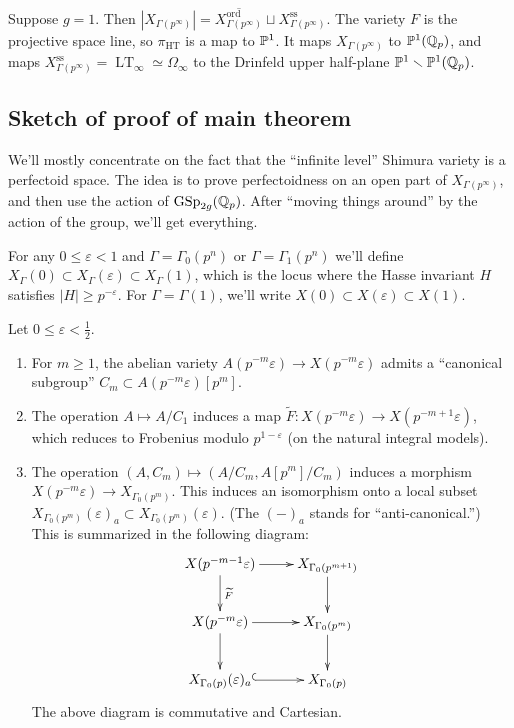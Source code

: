 \begin{example}
Suppose $g=1$. Then $|X_{\Gamma(p^\infty)}| = \overline{X_{\Gamma(p^\infty)}^\text{ord}}\sqcup X_{\Gamma(p^\infty)}^\text{ss}$. The variety $F$ is the projective space line, so 
$\pi_\text{HT}$ is a map to $\mathbb{P}^1$. It maps $X_{\Gamma(p^\infty)}$ to 
$\mathbb{P}^1(\mathbb{Q}_p)$, and maps 
$X_{\Gamma(p^\infty)}^\text{ss} = \operatorname{LT}_\infty\simeq \Omega_\infty$ 
to the Drinfeld upper half-plane $\mathbb{P}^1\smallsetminus \mathbb{P}^1(\mathbb{Q}_p)$. 
\end{example}





\subsection{Sketch of proof of main theorem}

We'll mostly concentrate on the fact that the ``infinite level'' Shimura variety is 
a perfectoid space. The idea is to prove perfectoidness on an open part of 
$X_{\Gamma(p^\infty)}$, and then use the action of 
$\operatorname{GSp}_{2g}(\mathbb{Q}_p)$. After ``moving things around'' by the action of 
the group, we'll get everything. 

For any $0\leqslant \varepsilon < 1$ and $\Gamma=\Gamma_0(p^n)$ or 
$\Gamma=\Gamma_1(p^n)$ we'll define $X_\Gamma(0)\subset X_\Gamma(\varepsilon)\subset X_\Gamma(1)$, 
which is the locus where the Hasse invariant $H$ satisfies 
$|H|\geqslant p^{-\varepsilon}$. For $\Gamma=\Gamma(1)$, we'll write 
$X(0)\subset X(\varepsilon)\subset X(1)$. 

\begin{proposition}
Let $0\leqslant \varepsilon < \frac 1 2$. 
\begin{enumerate}
  \item For $m\geqslant 1$, the abelian variety 
    $A(p^{-m}\varepsilon) \to X(p^{-m} \varepsilon)$ admits a ``canonical subgroup'' 
    $C_m\subset A(p^{-m}\varepsilon)[p^m]$. 
  \item The operation $A\mapsto A/C_1$ induces a map 
    $\widetilde F:X(p^{-m}\varepsilon) \to X(p^{-m+1}\varepsilon)$, which reduces to 
    Frobenius modulo $p^{1-\varepsilon}$ (on the natural integral models). 
  \item The operation $(A,C_m)\mapsto (A/C_m,A[p^m]/C_m)$ induces a morphism 
    $X(p^{-m}\varepsilon) \to X_{\Gamma_0(p^m)}$. This induces an isomorphism onto a 
    local subset $X_{\Gamma_0(p^m)}(\varepsilon)_a\subset X_{\Gamma_0(p^m)}(\varepsilon)$. (The $(-)_a$ stands for ``anti-canonical.'') This is summarized in the following diagram:
    \[\xymatrix{
      X(p^{-m-1}\varepsilon) \ar[r] \ar[d]^-{\widetilde F}
        & X_{\Gamma_0(p^{m+1})} \ar[d] \\
      X(p^{-m}\varepsilon) \ar[r] \ar[d] 
        & X_{\Gamma_0(p^m)} \ar[d] \\
      X_{\Gamma_0(p)}(\varepsilon)_a \ar@{^{(}->}[r] 
        & X_{\Gamma_0(p)} 
    }\]
    The above diagram is commutative and Cartesian. 
\end{enumerate}
\end{proposition}


